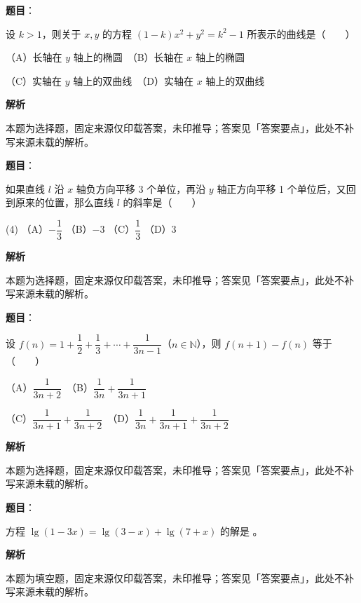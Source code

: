 \begin{answer}

\textbf{题目}：

设 $k>1$，则关于 $x,y$ 的方程 $(1-k)x^2+y^2=k^2-1$ 所表示的曲线是\mbox{（　　）}

（A）长轴在 $y$ 轴上的椭圆　（B）长轴在 $x$ 轴上的椭圆

（C）实轴在 $y$ 轴上的双曲线　（D）实轴在 $x$ 轴上的双曲线

\textbf{解析}

本题为选择题，固定来源仅印载答案，未印推导；答案见「答案要点」，此处不补写来源未载的解析。


\end{answer}
\begin{answer}

\textbf{题目}：

如果直线 $l$ 沿 $x$ 轴负方向平移 3 个单位，再沿 $y$ 轴正方向平移 1 个单位后，又回到原来的位置，那么直线 $l$ 的斜率是\mbox{（　　）}

\begin{gkopts}(4)
\task （A）$-\dfrac13$
\task （B）$-3$
\task （C）$\dfrac13$
\task （D）$3$
\end{gkopts}

\textbf{解析}

本题为选择题，固定来源仅印载答案，未印推导；答案见「答案要点」，此处不补写来源未载的解析。


\end{answer}
\begin{answer}

\textbf{题目}：

设 $f(n)=1+\dfrac12+\dfrac13+\cdots+\dfrac1{3n-1}$（$n\in\mathbb N$），则 $f(n+1)-f(n)$ 等于\mbox{（　　）}

（A）$\dfrac1{3n+2}$　（B）$\dfrac1{3n}+\dfrac1{3n+1}$

（C）$\dfrac1{3n+1}+\dfrac1{3n+2}$　（D）$\dfrac1{3n}+\dfrac1{3n+1}+\dfrac1{3n+2}$

\textbf{解析}

本题为选择题，固定来源仅印载答案，未印推导；答案见「答案要点」，此处不补写来源未载的解析。


\end{answer}
\begin{answer}

\textbf{题目}：

方程 $\lg(1-3x)=\lg(3-x)+\lg(7+x)$ 的解是 \gkblank{}。

\textbf{解析}

本题为填空题，固定来源仅印载答案，未印推导；答案见「答案要点」，此处不补写来源未载的解析。


\end{answer}
